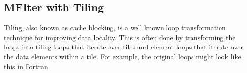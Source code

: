 \documentclass[letterpaper,10pt,english]{sphinxmanual}
\begin{document}
\begin{sphinxVerbatim}[commandchars=\\\{\}]
        
           
       
       
       
            
                  
                  
                  
               
\end{sphinxVerbatim}


\subsection{MFIter with Tiling}
\label{\detokenize{Basics:mfiter-with-tiling}}\label{\detokenize{Basics:sec-basics-mfiter-tiling}}
\sphinxAtStartPar
Tiling, also known as cache blocking, is a well known loop transformation
technique for improving data locality.  This is often done by transforming the
loops into tiling loops that iterate over tiles and element loops that iterate
over the data elements within a tile. For example, the original loops might
look like this in Fortran
\end{document}
